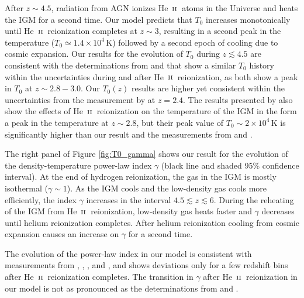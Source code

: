 \documentclass[twocolumn]{aastex62}
\def\HeII{\hbox{He~$\scriptstyle\rm II$}}
\begin{document}
After $z\sim 4.5$, radiation from AGN ionizes \HeII\ atoms in the Universe
and heats the IGM for a second time.
Our model predicts that $T_0$ increases monotonically until \HeII\
reionization completes at $z\sim 3$, resulting in a second peak in the temperature ($T_0 \simeq 1.4\times 10^4\, \mathrm{K}$) followed by a second epoch of cooling due to cosmic
expansion.
Our results for the evolution of $T_0$ during $z\lesssim 4.5$ are
consistent with the determinations from \cite{gaikwad2020b} and \cite{walther2019a} that
show a similar
$T_0$ history within the uncertainties during and after \HeII\ reionization,
as both show a peak in $T_0$ at $z\sim 2.8 - 3.0$.
Our $T_0(z)$ results are higher yet
consistent within the uncertainties from the measurement by \cite{bolton2014a} at $z=2.4$. 
The results presented by \cite{hiss2018a} also show the effects of 
\HeII\ reionization on the temperature of the IGM in the form a peak in the temperature at $z\sim 2.8$,
but their  peak value of $T_0\sim 2\times 10^4\, \mathrm{K}$ is significantly 
higher than our result and the measurements from \cite{gaikwad2020a} and \cite{walther2019a}.

The right panel of Figure \ref{fig:T0_gamma} shows our result for the evolution of the
density-temperature power-law index $\gamma$
(black line and shaded 95\% confidence interval).
At the end of hydrogen reionization, 
the gas in the IGM is mostly isothermal ($\gamma \sim 1$).
As the IGM cools and the 
low-density gas cools more efficiently, the index $\gamma$ increases in the interval 
$ 4.5 \lesssim z \lesssim 6$. 
During the reheating of the IGM from \HeII\ reionization, low-density gas heats faster
and $\gamma$ decreases until helium reionization completes. 
After helium reionization cooling from cosmic expansion
causes an increase on $\gamma$ for a second time.


The evolution of the power-law index in our model is consistent with
measurements from \cite{hiss2018a}, \cite{boera2019a},  \cite{gaikwad2020a},  and \cite{gaikwad2020b},
and shows deviations only for a few redshift bins after \HeII\ reionization
completes.
The transition in $\gamma$ after \HeII\ reionization in our model is not as pronounced as the determinations
from \cite{gaikwad2020b} and \cite{hiss2018a}. 
\end{document}
